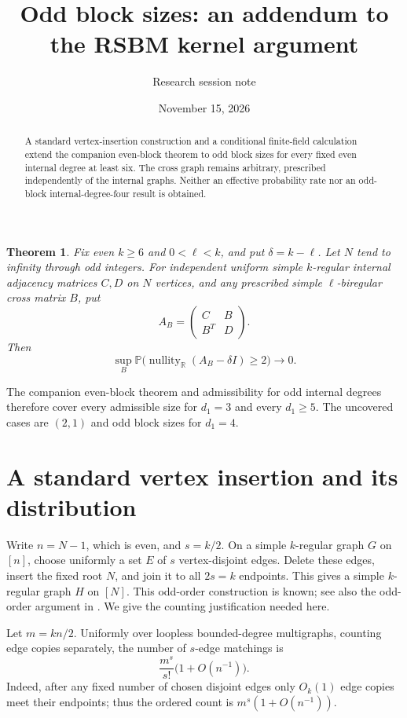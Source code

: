 \documentclass[11pt]{article}
\title{Odd block sizes: an addendum to the RSBM kernel argument}
\author{Research session note}
\date{November 15, 2026}
\newtheorem{theorem}{Theorem}
\newcommand{\Prob}{\mathbb P}
\newcommand{\nullity}{\operatorname{nullity}}
\begin{document}
\maketitle
\begin{abstract}
A standard vertex-insertion construction and a conditional finite-field calculation extend the companion even-block theorem to odd block sizes for every fixed even internal degree at least six. The cross graph remains arbitrary, prescribed independently of the internal graphs. Neither an effective probability rate nor an odd-block internal-degree-four result is obtained.
\end{abstract}

\begin{theorem}\label{thm:odd}
Fix even $k\ge6$ and $0<\ell<k$, and put $\delta=k-\ell$. Let $N$ tend to infinity through odd integers. For independent uniform simple $k$-regular internal adjacency matrices $C,D$ on $N$ vertices, and any prescribed simple $\ell$-biregular cross matrix $B$, put
\[
 A_B=\begin{pmatrix}C&B\\B^T&D\end{pmatrix}.
\]
Then
\[
 \sup_B\Prob\bigl(\nullity_{\mathbb R}(A_B-\delta I)\ge2\bigr)\longrightarrow0.
\]
\end{theorem}
The companion even-block theorem and admissibility for odd internal degrees therefore cover every admissible size for $d_1=3$ and every $d_1\ge5$. The uncovered cases are $(2,1)$ and odd block sizes for $d_1=4$.

\section{A standard vertex insertion and its distribution}
Write $n=N-1$, which is even, and $s=k/2$. On a simple $k$-regular graph $G$ on $[n]$, choose uniformly a set $E$ of $s$ vertex-disjoint edges. Delete these edges, insert the fixed root $N$, and join it to all $2s=k$ endpoints. This gives a simple $k$-regular graph $H$ on $[N]$. This odd-order construction is known; see also the odd-order argument in \cite{hlmpw}. We give the counting justification needed here.

Let $m=kn/2$. Uniformly over loopless bounded-degree multigraphs, counting edge copies separately, the number of $s$-edge matchings is
\begin{equation}\label{eq:matchcount}
 \frac{m^s}{s!}\bigl(1+O(n^{-1})\bigr).
\end{equation}
Indeed, after any fixed number of chosen disjoint edges only $O_k(1)$ edge copies meet their endpoints; thus the ordered count is $m^s(1+O(n^{-1}))$.
\end{document}
